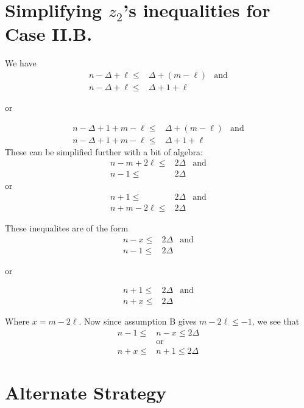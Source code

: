 \newpage
\section{Simplifying $z_2$'s inequalities for Case II.B.}

We have
\begin{align*}
 n - \Delta + \ell \leq & \Delta + (m - \ell) & \text{and} \\
 n - \Delta + \ell \leq & \Delta + 1 + \ell
\end{align*}
\begin{center}or\end{center}
\begin{align*}
 n - \Delta + 1 + m - \ell \leq & \Delta + (m - \ell) & \text{and} \\
 n - \Delta + 1 + m - \ell \leq & \Delta + 1 + \ell
\end{align*}
These can be simplified further with a bit of algebra:
\begin{align*}
 n-m+2\ell \leq & 2 \Delta & \text{and} \\
 n-1 \leq       & 2\Delta
\end{align*}
or
\begin{align*}
 n+1 \leq        & 2 \Delta & \text{and} \\
 n+m-2\ell  \leq & 2 \Delta
\end{align*}

These inequalites are of the form
\begin{align*}
 n-x \leq & 2 \Delta & \text{and} \\
 n-1 \leq & 2\Delta
\end{align*}
\begin{center}or\end{center}
\begin{align*}
 n + 1 \leq & 2 \Delta & \text{and} \\
 n + x \leq & 2 \Delta
\end{align*}

Where $x = m -2\ell$. Now since assumption B gives $m - 2\ell \leq -1$, we
see that
\begin{align*}
 n-1 \leq & n-x \leq 2 \Delta \\
          & \text{or}         \\
 n+x \leq & n+1 \leq 2 \Delta
\end{align*}

\newpage
\section{Alternate Strategy}

